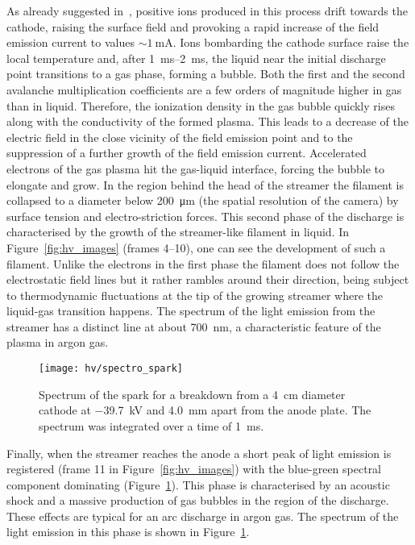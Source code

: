 As already suggested in~\cite{breakdown_14}, positive ions produced in this process drift towards the cathode, raising the surface field and provoking a rapid increase of the field emission current to values $\sim{\SI{1}{\milli\ampere}}$.
Ions bombarding the cathode surface raise the local temperature and, after \SIrange{1}{2}{\milli\second}, the liquid near the initial discharge point transitions to a gas phase, forming a bubble.
Both the first and the second avalanche multiplication coefficients are a few orders of magnitude higher in gas than in liquid.
Therefore, the ionization density in the gas bubble quickly rises along with the conductivity of the formed plasma.
This leads to a decrease of the electric field in the close vicinity of the field emission point and to the suppression of a further growth of the field emission current.
Accelerated electrons of the gas plasma hit the gas-liquid interface, forcing the bubble to elongate and grow.
In the region behind the head of the streamer the filament is collapsed to a diameter below \SI{200}{\micro\metre} (the spatial resolution of the camera) by surface tension and electro-striction forces.
This second phase of the discharge is characterised by the growth of the streamer-like filament in liquid.
In Figure~\ref{fig:hv_images} (frames \numrange{4}{10}), one can see the development of such a filament.
Unlike the electrons in the first phase the filament does not follow the electrostatic field lines but it rather rambles around their direction, being subject to thermodynamic fluctuations at the tip of the growing streamer where the liquid-gas transition happens.
The spectrum of the light emission from the streamer has a distinct line at about \SI{700}{\nano\metre}, a characteristic feature of the plasma in argon gas.

\begin{figure}[htb]
	\centering
	\texttt{[image: hv/spectro\_spark]}
	\caption[ test spark spectrum]{%
		Spectrum of the spark for a breakdown from a \SI{4}{\centi\metre} diameter cathode at \SI{-39.7}{\kilo\volt} and \SI{4.0}{\milli\metre} apart from the anode plate.
		The spectrum was integrated over a time of \SI{1}{\milli\second}.
	}
	\label{fig:hv_spectro_spark}
\end{figure}

Finally, when the streamer reaches the anode a short peak of light emission is registered (frame \num{11} in Figure~\ref{fig:hv_images}) with the blue-green spectral component dominating (Figure~\ref{fig:hv_spectro_spark}).
This phase is characterised by an acoustic shock and a massive production of gas bubbles in the region of the discharge.
These effects are typical for an arc discharge in argon gas.
The spectrum of the light emission in this phase  is shown in Figure~\ref{fig:hv_spectro_spark}. 

